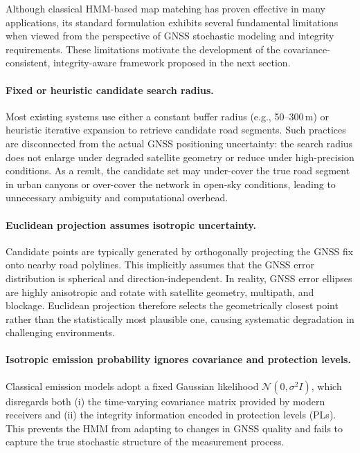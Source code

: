 \documentclass[letterpaper,journal]{IEEEtran}
\begin{document}
Although classical HMM-based map matching has proven effective in many
applications, its standard formulation exhibits several fundamental
limitations when viewed from the perspective of GNSS stochastic modeling
and integrity requirements. These limitations motivate the development of
the covariance-consistent, integrity-aware framework proposed in the next
section.

\paragraph{Fixed or heuristic candidate search radius.}
Most existing systems use either a constant buffer radius (e.g., 50--300\,m)
or heuristic iterative expansion to retrieve candidate road segments.
Such practices are disconnected from the actual GNSS positioning uncertainty:
the search radius does not enlarge under degraded satellite geometry or reduce
under high-precision conditions. As a result, the candidate set may
under-cover the true road segment in urban canyons or over-cover the network
in open-sky conditions, leading to unnecessary ambiguity and computational
overhead.

\paragraph{Euclidean projection assumes isotropic uncertainty.}
Candidate points are typically generated by orthogonally projecting the GNSS
fix onto nearby road polylines. This implicitly assumes that the GNSS error
distribution is spherical and direction-independent. In reality, GNSS error
ellipses are highly anisotropic and rotate with satellite geometry, multipath,
and blockage. Euclidean projection therefore selects the geometrically closest
point rather than the statistically most plausible one, causing systematic
degradation in challenging environments.

\paragraph{Isotropic emission probability ignores covariance and protection levels.}
Classical emission models adopt a fixed Gaussian likelihood
$\mathcal{N}(0,\sigma^2 I)$, which disregards both
(i) the time-varying covariance matrix provided by modern receivers and  
(ii) the integrity information encoded in protection levels (PLs).
This prevents the HMM from adapting to changes in GNSS quality and fails to
capture the true stochastic structure of the measurement process.
\end{document}

